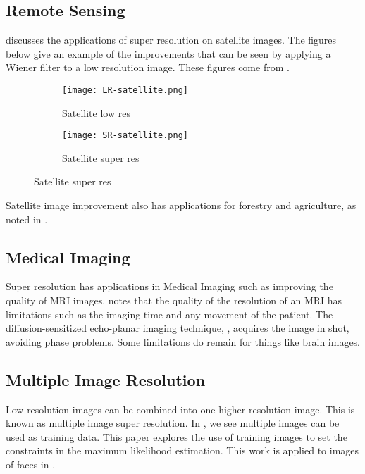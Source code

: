 \documentclass{article}
\begin{document}
\subsection{Remote Sensing}
\cite{Li} discusses the applications of super resolution on satellite
images. The figures below give an example of the improvements that can
be seen by applying a Wiener filter to a low resolution image. These
figures come from \cite{Li}.    
\begin{figure}[H]
  \centering
  \begin{subfigure}[b]{0.5\textwidth}
    \centering
  \texttt{[image: LR-satellite.png]}
  \caption{\label{fig:label} Satellite low res }
\end{subfigure}%
\begin{subfigure}[b]{0.5\textwidth}
  \centering
  \texttt{[image: SR-satellite.png]}
  \caption{\label{fig:label} Satellite super res }
  \end{subfigure}
\end{figure}
Satellite image improvement also has applications for forestry and
agriculture, as noted in \cite{LiSatellite}.

\subsection{Medical Imaging}
Super resolution has applications in Medical Imaging such as improving
the quality of MRI images. \cite{Peled} notes that the quality of the resolution of
an MRI has limitations such as the imaging time and any
movement of the patient. The diffusion-sensitized echo-planar imaging
technique, \cite{Peled}, acquires the image in shot, avoiding phase problems. Some
limitations do remain for things like brain images.  


\subsection{Multiple Image Resolution}
Low resolution images can be combined into one higher resolution
image. This is known as multiple image super resolution. In
\cite{CapelMulti}, we see multiple images can be used as training
data. This paper explores the use of training images
to set the constraints in the maximum likelihood estimation. This work
is applied to images of faces in \cite{CapelMulti}.
 
\end{document}
